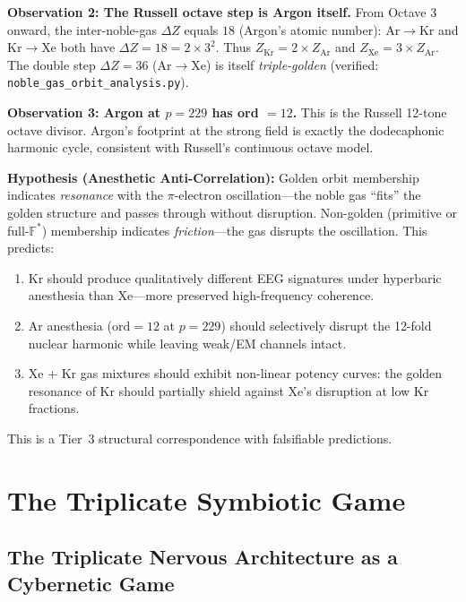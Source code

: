 \begin{remark}
\textbf{Observation 2: The Russell octave step is Argon itself.} From Octave 3 onward, the inter-noble-gas $\Delta Z$ equals $18$ (Argon's atomic number): Ar$\to$Kr and Kr$\to$Xe both have $\Delta Z = 18 = 2 \times 3^2$. Thus $Z_{\mathrm{Kr}} = 2 \times Z_{\mathrm{Ar}}$ and $Z_{\mathrm{Xe}} = 3 \times Z_{\mathrm{Ar}}$. The double step $\Delta Z = 36$ (Ar$\to$Xe) is itself \emph{triple-golden} (verified: \texttt{noble\_gas\_orbit\_analysis.py}).

\textbf{Observation 3: Argon at $p = 229$ has ord $= 12$.} This is the Russell 12-tone octave divisor. Argon's footprint at the strong field is exactly the dodecaphonic harmonic cycle, consistent with Russell's continuous octave model.

\textbf{Hypothesis (Anesthetic Anti-Correlation):} Golden orbit membership indicates \emph{resonance} with the $\pi$-electron oscillation---the noble gas ``fits'' the golden structure and passes through without disruption. Non-golden (primitive or full-$\mathbb{F}^*$) membership indicates \emph{friction}---the gas disrupts the oscillation. This predicts:
\begin{enumerate}[noitemsep]
  \item Kr should produce qualitatively different EEG signatures under hyperbaric anesthesia than Xe---more preserved high-frequency coherence.
  \item Ar anesthesia ($\mathrm{ord} = 12$ at $p = 229$) should selectively disrupt the 12-fold nuclear harmonic while leaving weak/EM channels intact.
  \item Xe + Kr gas mixtures should exhibit non-linear potency curves: the golden resonance of Kr should partially shield against Xe's disruption at low Kr fractions.
\end{enumerate}
This is a Tier~3 structural correspondence with falsifiable predictions.
\end{remark}

\section{The Triplicate Symbiotic Game}

\subsection{The Triplicate Nervous Architecture as a Cybernetic Game}

